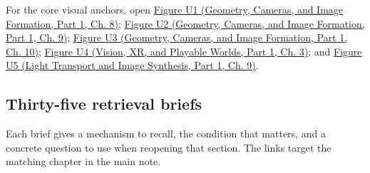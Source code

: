 For the core visual anchors, open \href{../03-Geometry-Cameras-and-Image-Formation-P01/main.pdf\#nameddest=03-visual-computing-i-ch001-figure-u1---linear-maps-separate-directions-stretches-and-output-placement}{Figure U1 (Geometry, Cameras, and Image Formation, Part 1, Ch. 8)}; \href{../03-Geometry-Cameras-and-Image-Formation-P01/main.pdf\#nameddest=03-visual-computing-i-ch002-figure-u2---a-half-edge-separates-face-traversal-from-edge-traversal}{Figure U2 (Geometry, Cameras, and Image Formation, Part 1, Ch. 9)}; \href{../03-Geometry-Cameras-and-Image-Formation-P01/main.pdf\#nameddest=03-visual-computing-i-ch003-figure-u3---two-signals-can-share-the-same-samples}{Figure U3 (Geometry, Cameras, and Image Formation, Part 1, Ch. 10)}; \href{../07-Vision-XR-and-Playable-Worlds-P01/main.pdf\#nameddest=04-visual-computing-ii-ch032-figure-u4---lighting-rank-determines-which-normal-components-can-be-measured}{Figure U4 (Vision, XR, and Playable Worlds, Part 1, Ch. 3)}; and \href{../04-Light-Transport-and-Image-Synthesis-P01/main.pdf\#nameddest=04-visual-computing-ii-ch035-figure-u5---a-direct-light-renderer-makes-the-pipeline-executable}{Figure U5 (Light Transport and Image Synthesis, Part 1, Ch. 9)}.

\subsection{Thirty-five retrieval briefs}\label{appendix-a8f634b076b5-thirty-five-retrieval-briefs}

\hypertarget{appendix-a8f634b076b5-thirty-five-retrieval-briefs}{}

Each brief gives a mechanism to recall, the condition that matters, and a concrete question to use when reopening that section. The links target the matching chapter in the main note.

